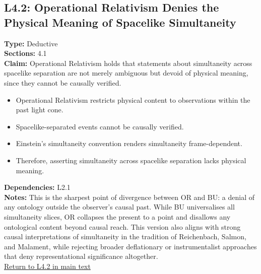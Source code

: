 \documentclass[12pt]{book}
\newcommand{\returnlink}[1]{\hyperref[logic:#1]{Return to #1 in main text}\xspace}
\begin{document}
\subsection*{L4.2: Operational Relativism Denies the Physical Meaning of Spacelike Simultaneity}\label{appendix:L4.2}
\textbf{Type:} Deductive \\
\textbf{Sections:} 4.1 \\
\textbf{Claim:} Operational Relativism holds that statements about simultaneity across spacelike separation are not merely ambiguous but devoid of physical meaning, since they cannot be causally verified.
\begin{itemize}
  \item Operational Relativism restricts physical content to observations within the past light cone.
  \item Spacelike-separated events cannot be causally verified.
  \item Einstein's simultaneity convention renders simultaneity frame-dependent.
  \item Therefore, asserting simultaneity across spacelike separation lacks physical meaning.
\end{itemize}
\textbf{Dependencies:} L2.1 \\
\textbf{Notes:} This is the sharpest point of divergence between OR and BU: a denial of any ontology outside the observer's causal past. While BU universalises all simultaneity slices, OR collapses the present to a point and disallows any ontological content beyond causal reach. This version also aligns with strong causal interpretations of simultaneity in the tradition of Reichenbach, Salmon, and Malament, while rejecting broader deflationary or instrumentalist approaches that deny representational significance altogether. \\
\returnlink{L4.2}
\end{document}
